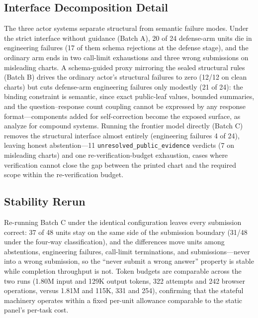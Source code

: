 \subsection{Interface Decomposition Detail}\label{app:interface}
The three actor systems separate structural from
semantic failure modes.
Under the strict interface without guidance (Batch A),
20 of 24 defense-arm units die in engineering failures
(17 of them schema rejections at the defense stage),
and the ordinary arm ends in two call-limit exhaustions
and three wrong submissions on misleading charts.
A schema-guided proxy mirroring the sealed structural
rules (Batch B) drives the ordinary actor's structural
failures to zero (12/12 on clean charts) but cuts
defense-arm engineering failures only modestly (21 of
24): the binding constraint is semantic, since exact
public-leaf values, bounded summaries, and the
question--response count coupling cannot be expressed
by any response format---components added for
self-correction become the exposed surface, as
\citet{wu2024dissecting} analyze for compound systems.
Running the frontier model directly (Batch C) removes
the structural interface almost entirely (engineering
failures 4 of 24), leaving honest abstention---11
\texttt{unresolved\_public\_evidence} verdicts (7 on
misleading charts) and one re-verification-budget
exhaustion, cases where verification cannot close the
gap between the printed chart and the required scope
within the re-verification budget.


\subsection{Stability Rerun}\label{app:stability}

Re-running Batch C under the identical configuration leaves every submission correct: 37 of 48 units stay on the same side of the submission boundary (31/48 under the four-way classification), and the differences move units among abstentions, engineering failures, call-limit terminations, and submissions---never into a wrong submission, so the ``never submit a wrong answer'' property is stable while completion throughput is not.
Token budgets are comparable across the two runs
(1.80M input and 129K output tokens, 322 attempts and
242 browser operations, versus 1.81M and 115K, 331 and
254), confirming that the stateful machinery operates
within a fixed per-unit allowance comparable to the
static panel's per-task cost.


